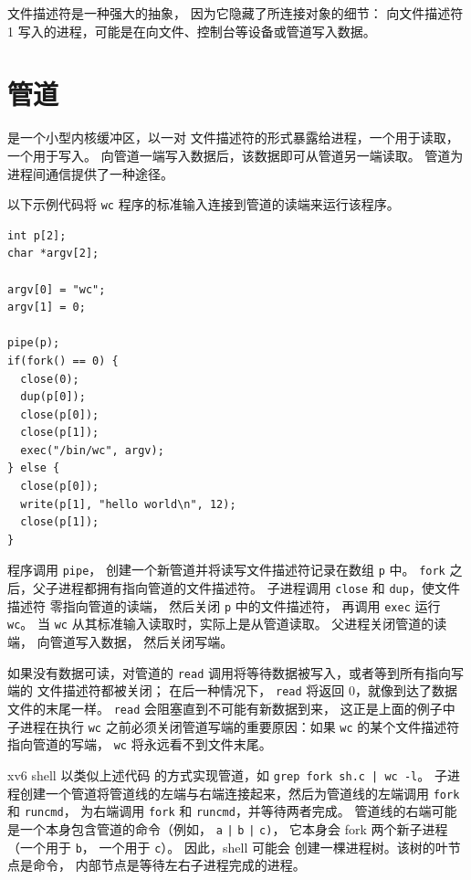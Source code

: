 文件描述符是一种强大的抽象，
因为它隐藏了所连接对象的细节：
向文件描述符 1 写入的进程，可能是在向文件、控制台等设备或管道写入数据。
\section{管道}

是一个小型内核缓冲区，以一对
文件描述符的形式暴露给进程，一个用于读取，一个用于写入。
向管道一端写入数据后，该数据即可从管道另一端读取。
管道为进程间通信提供了一种途径。

以下示例代码将
\lstinline{wc}
程序的标准输入连接到管道的读端来运行该程序。
\begin{lstlisting}[]
int p[2];
char *argv[2];

argv[0] = "wc";
argv[1] = 0;

pipe(p);
if(fork() == 0) {
  close(0);
  dup(p[0]);
  close(p[0]);
  close(p[1]);
  exec("/bin/wc", argv);
} else {
  close(p[0]);
  write(p[1], "hello world\n", 12);
  close(p[1]);
}
\end{lstlisting}
程序调用
\lstinline{pipe}，
创建一个新管道并将读写文件描述符记录在数组
\lstinline{p}
中。
\lstinline{fork}
之后，父子进程都拥有指向管道的文件描述符。
子进程调用 \lstinline{close} 和 \lstinline{dup}，使文件描述符
零指向管道的读端，
然后关闭
\lstinline{p}
中的文件描述符，
再调用 \lstinline{exec} 运行
\lstinline{wc}。
当
\lstinline{wc}
从其标准输入读取时，实际上是从管道读取。
父进程关闭管道的读端，
向管道写入数据，
然后关闭写端。

如果没有数据可读，对管道的
\lstinline{read}
调用将等待数据被写入，或者等到所有指向写端的
文件描述符都被关闭；
在后一种情况下，
\lstinline{read}
将返回 0，就像到达了数据文件的末尾一样。
\lstinline{read}
会阻塞直到不可能有新数据到来，
这正是上面的例子中子进程在执行
\lstinline{wc}
之前必须关闭管道写端的重要原因：如果
\lstinline{wc}
的某个文件描述符指向管道的写端，
\lstinline{wc}
将永远看不到文件末尾。

xv6 shell 以类似上述代码
的方式实现管道，如
\lstinline{grep fork sh.c | wc -l}。
子进程创建一个管道将管道线的左端与右端连接起来，然后为管道线的左端调用
\lstinline{fork}
和
\lstinline{runcmd}，
为右端调用
\lstinline{fork}
和
\lstinline{runcmd}，并等待两者完成。
管道线的右端可能是一个本身包含管道的命令（例如，
\lstinline{a}
\lstinline{|}
\lstinline{b}
\lstinline{|}
\lstinline{c)}，
它本身会 fork 两个新子进程（一个用于
\lstinline{b}，
一个用于
\lstinline{c}）。
因此，shell 可能会
创建一棵进程树。该树的叶节点是命令，
内部节点是等待左右子进程完成的进程。

